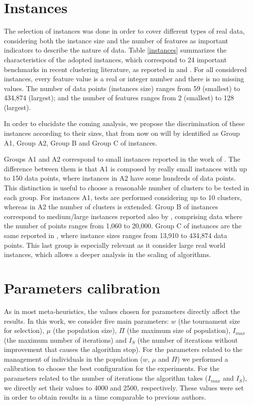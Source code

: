 \section{Instances}
\label{sec:instances}
The selection of instances was done in order to cover different types of real data, considering both the instance size and the number of features as important indicators to describe the nature of data. Table \ref{instances} summarizes the characteristics of the adopted instances, which correspond to 24 important benchmarks in recent clustering literature, as reported in \cite{Ordin2014} and \cite{Bagirov2016}. For all considered instances, every feature value is a real or integer number and there is no missing values. The number of data points (instances size) ranges from 59 (smallest) to 434,874 (largest); and the number of features ranges from 2 (smallest) to 128 (largest).

In order to elucidate the coming analysis, we propose the discrimination of these instances according to their sizes, that from now on will by identified as Group A1, Group A2, Group B and Group C of instances.

Groups A1 and A2 correspond to small instances reported in the work of \cite{Ordin2014}. The difference between them is that A1 is composed by really small instances with up to 150 data points, where instances in A2 have some hundreds of data points. This distinction is useful to choose a reasonable number of clusters to be tested in each group. For instances A1, tests are performed considering up to 10 clusters, whereas in A2 the number of clusters is extended. Group B of instances correspond to medium/large instances reported also by \cite{Ordin2014}, comprising data where the number of points ranges from 1,060 to 20,000. Group C of instances are the same reported in \cite{Bagirov2016}, where instance sizes ranges from 13,910 to 434,874 data points. This last group is especially relevant as it consider large real world instances, which allows a deeper analysis in the scaling of algorithms.



\section{Parameters calibration}
\label{sec:calibration}
As in most meta-heuristics, the values chosen for parameters directly affect the results. In this work, we consider five main parameters: $w$ (the tournament size for selection), $\mu$ (the population size), $\Pi$ (the maximum size of population), $I_{max}$ (the maximum number of iterations) and $I_S$ (the number of iterations without improvement that causes the algorithm stop). For the parameters related to the management of individuals in the population ($w$, $\mu$ and $\Pi$) we performed a calibration to choose the best configuration for the experiments. For the parameters related to the number of iterations the algorithm takes ($I_{max}$ and $I_S$), we directly set their values to 4000 and 2500, respectively. These values were set in order to obtain results in a time comparable to previous authors.

